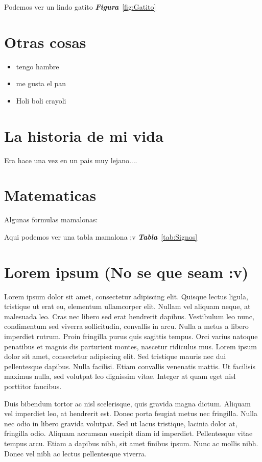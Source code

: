 \documentclass{book}
\begin{document}
Podemos ver un lindo gatito
\emph{\textbf{Figura}}~\ref{fig:Gatito}

\section{Otras cosas}
\begin{itemize}
\item tengo hambre
\item me gusta el pan
\item Holi boli crayoli
\end{itemize}

\section{La historia de mi vida}
Era hace una vez en un pais muy lejano....

\newpage
\section{Matematicas}
Algunas formulas mamalonas:

Aqui podemos ver una tabla mamalona ;v
\emph{\textbf{Tabla}}~\ref{tab:Signos}

\section{Lorem ipsum (No se que seam :v)}

Lorem ipsum dolor sit amet, consectetur adipiscing elit. Quisque lectus ligula,
tristique ut erat eu, elementum ullamcorper elit. Nullam vel aliquam neque, at
malesuada leo. Cras nec libero sed erat hendrerit dapibus. Vestibulum leo nunc,
condimentum sed viverra sollicitudin, convallis in arcu. Nulla a metus a libero
imperdiet rutrum. Proin fringilla purus quis sagittis tempus. Orci varius
natoque penatibus et magnis dis parturient montes, nascetur ridiculus mus. Lorem
ipsum dolor sit amet, consectetur adipiscing elit. Sed tristique mauris nec dui
pellentesque dapibus. Nulla facilisi. Etiam convallis venenatis mattis. Ut
facilisis maximus nulla, sed volutpat leo dignissim vitae. Integer at quam eget
nisl porttitor faucibus.

Duis bibendum tortor ac nisl scelerisque, quis gravida magna dictum. Aliquam vel
imperdiet leo, at hendrerit est. Donec porta feugiat metus nec fringilla. Nulla
nec odio in libero gravida volutpat. Sed ut lacus tristique, lacinia dolor at,
fringilla odio. Aliquam accumsan suscipit diam id imperdiet. Pellentesque vitae
tempus arcu. Etiam a dapibus nibh, sit amet finibus ipsum. Nunc ac mollis
nibh. Donec vel nibh ac lectus pellentesque viverra.
\end{document}

